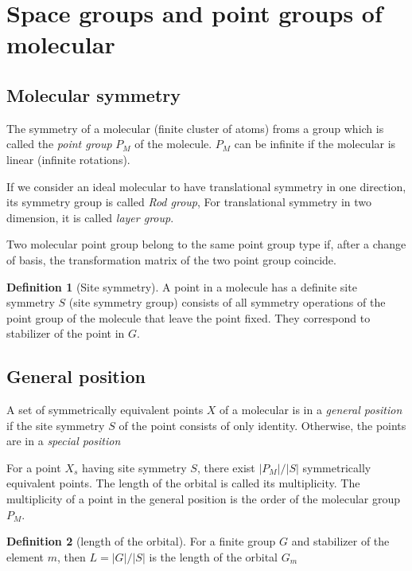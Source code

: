 \documentclass{amsart}
\theoremstyle{remark}
\theoremstyle{remark}
\theoremstyle{definition}
\newtheorem*{definition}{Definition}
\begin{document}
\vspace{10pt}
\section*{Space groups and point groups of molecular}
\subsection*{Molecular symmetry}
The symmetry of a molecular (finite cluster of atoms) froms a group which is called the \emph{point group} $P_M$ of the molecule. $P_M$
can be infinite if the molecular is linear (infinite rotations). 

If we consider an ideal molecular to have translational symmetry in one direction, its symmetry group is called \emph{Rod group}, 
For translational symmetry in two dimension, it is called \emph{layer group}.

Two molecular point group belong to the same point group type if, after a change of basis, the transformation matrix of the two point group
coincide. 

\vspace{10pt}

\begin{definition}
    [Site symmetry]
    A point in a molecule has a definite site symmetry $S$ (site symmetry group) consists of all symmetry operations of the point group
    of the molecule that leave the point fixed. They correspond to stabilizer of the point in $G$.
\end{definition}

\subsection*{General position}
A set of symmetrically equivalent points $X$ of a molecular is in a \emph{general position} if the site symmetry $S$ of the point
consists of only identity. 
Otherwise, the points are in a \emph{special position}

For a point $X_s$ having site symmetry $S$, there exist $|P_M|/|S|$ symmetrically equivalent points. 
The length of the orbital is called its multiplicity.
The multiplicity of a point in the general position is the order of the molecular group $P_M$.

\begin{definition}
    [length of the orbital]
    For a finite group $G$ and stabilizer of the element $m$, then $L = |G|/|S|$ is the length of the orbital $G_m$
\end{definition}
\end{document}

